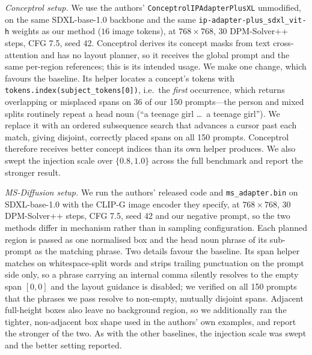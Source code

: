 \documentclass[10pt,twocolumn,letterpaper]{article}
\begin{document}
\noindent\textit{Conceptrol setup.}
\label{sec:conceptrol_setup}
We use the authors' \texttt{Conceptrol\allowbreak IPAdapter\allowbreak Plus\allowbreak XL} unmodified, on the same
SDXL-base-1.0 backbone and the same \texttt{ip-adapter-plus\_sdxl\_vit-h}
weights as our method ($16$ image tokens), at $768\!\times\!768$, 30
DPM-Solver++ steps, CFG 7.5, seed 42.  Conceptrol derives its concept masks
from text cross-attention and has no layout planner, so it receives the global
prompt and the same per-region references; this is its intended usage.  We make
one change, which favours the baseline.  Its helper locates a concept's tokens
with \texttt{tokens.index(subject\_tokens[0])}, i.e.\ the \emph{first}
occurrence, which returns overlapping or misplaced spans on 36 of our 150
prompts---the person and mixed splits routinely repeat a head noun (``a teenage
girl \ldots\ a teenage girl'').  We replace it with an ordered subsequence
search that advances a cursor past each match, giving disjoint, correctly
placed spans on all 150 prompts.  Conceptrol therefore receives better concept
indices than its own helper produces.  We also swept the injection scale over
$\{0.8, 1.0\}$ across the full benchmark and report the stronger result.

\noindent\textit{MS-Diffusion setup.}
\label{sec:msdiffusion_setup}
We run the authors' released code and \texttt{ms\_adapter.bin} on
SDXL-base-1.0 with the CLIP-G image encoder they specify, at
$768\!\times\!768$, 30 DPM-Solver++ steps, CFG 7.5, seed 42 and our negative
prompt, so the two methods differ in mechanism rather than in sampling
configuration.  Each planned region is passed as one normalised box and the
head noun phrase of its sub-prompt as the matching phrase.  Two details
favour the baseline.  Its span helper matches on whitespace-split words and
strips trailing punctuation on the prompt side only, so a phrase carrying an
internal comma silently resolves to the empty span $[0,0]$ and the layout
guidance is disabled; we verified on all 150 prompts that the phrases we pass
resolve to non-empty, mutually disjoint spans.  Adjacent full-height boxes
also leave no background region, so we additionally ran the tighter,
non-adjacent box shape used in the authors' own examples, and report the
stronger of the two.  As with the other baselines, the injection scale was
swept and the better setting reported.
\end{document}
